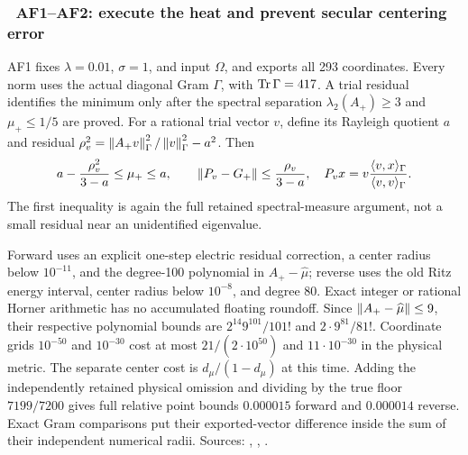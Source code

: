 \subsubsection{\workstar\ AF1--AF2: execute the heat and prevent secular centering error}

AF1 fixes $\lambda=0.01$, $\sigma=1$, and input $\Omega$, and exports all 293
coordinates.  Every norm uses the actual diagonal Gram $\Gamma$, with
$\operatorname{Tr}\Gamma=417$.  A trial residual identifies the minimum only after the
spectral separation $\lambda_2(A_+)\ge3$ and $\mu_+\le1/5$ are proved.
For a rational trial vector $v$, define its Rayleigh quotient $a$ and residual
$\rho_v^2=\left\lVert A_+v\right\rVert_\Gamma^2/\left\lVert v\right\rVert_\Gamma^2-a^2$.  Then
\begin{equation}
 a-\frac{\rho_v^2}{3-a}\le\mu_+\le a,\qquad
 \left\lVert P_v-G_+\right\rVert\le\frac{\rho_v}{3-a},\quad
 P_vx=v\frac{\langle v,x\rangle_\Gamma}{\langle v,v\rangle_\Gamma}.
 \label{recent:numerical-minimum}
\end{equation}
The first inequality is again the full retained spectral-measure argument,
not a small residual near an unidentified eigenvalue.

Forward uses an explicit one-step electric residual correction, a center radius
below $10^{-11}$, and the degree-100 polynomial in $A_+-\widehat\mu$;
reverse uses the old Ritz energy interval, center radius below $10^{-8}$,
and degree 80.  Exact integer or rational Horner arithmetic has no accumulated
floating roundoff.  Since $\left\lVert A_+-\widehat\mu\right\rVert\le9$, their respective
polynomial bounds are $2^{14}9^{101}/101!$ and $2\cdot9^{81}/81!$.
Coordinate grids $10^{-50}$ and $10^{-30}$ cost at most
$21/(2\cdot10^{50})$ and $11\cdot10^{-30}$ in the physical metric.  The separate
center cost is $d_\mu/(1-d_\mu)$ at this time.
Adding the independently retained physical omission and dividing by the true
floor $7199/7200$ gives full relative point bounds $0.000015$ forward and
$0.000014$ reverse.  Exact Gram comparisons put their exported-vector difference
inside the sum of their independent numerical radii.
Sources: ,
,
.

